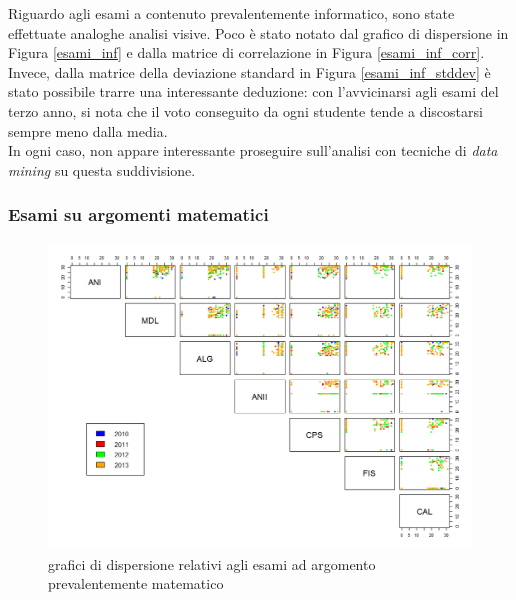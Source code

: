                 Riguardo agli esami a contenuto prevalentemente informatico, sono state effettuate analoghe analisi visive. Poco è stato notato dal grafico di dispersione in Figura \ref{esami_inf} e dalla matrice di correlazione in Figura \ref{esami_inf_corr}. Invece, dalla matrice della deviazione standard in Figura \ref{esami_inf_stddev} è stato possibile trarre una interessante deduzione: con l’avvicinarsi agli esami del terzo anno, si nota che il voto conseguito da ogni studente tende a discostarsi sempre meno dalla media. \\

                In ogni caso, non appare interessante proseguire sull'analisi con tecniche di \textit{data mining} su questa suddivisione.

            \subsubsection{Esami su argomenti matematici}

                \begin{figure}
                    \centering
                    \caption{grafici di dispersione relativi agli esami ad argomento prevalentemente matematico}
                    \label{esami_mat}
                	\includegraphics[scale=0.38]{img/scatter_plot_8_gen.png}
                \end{figure}

